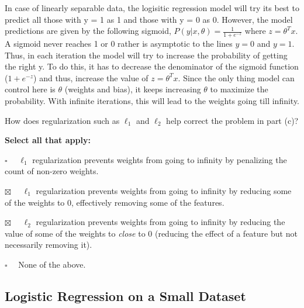 \documentclass[11pt,addpoints,answers]{exam}
\newcommand{\emptysquare}{{\LARGE $\square$}\ \ }
\newcommand{\filledsquare}{{\LARGE $\boxtimes$}\ \ }
\begin{document}
\begin{questions}
    
    \begin{your_solution}[height=6cm]
    In case of linearly separable data, the logisitic regression model will try its best to predict all those with y = 1 as 1 and those with y = 0 as 0. However, the model predictions are given by the following sigmoid, $P(y|x,\theta) = \frac{1}{1 + e^{-z}}$ where $z = \theta^Tx$. A sigmoid never reaches 1 or 0 rather is asymptotic to the lines $y = 0$ and $y = 1$. Thus, in each iteration the model will try to increase the probability of getting the right y. To do this, it has to decrease the denominator of the sigmoid function ($1 + e^{-z}$) and thus, increase the value of  $z = \theta^Tx$. Since the only thing model can control here is $\theta$ (weights and bias), it keeps increasing $\theta$ to maximize the probability. With infinite iterations, this will lead to the weights going till infinity.
    \end{your_solution}
    
    \question[2] How does regularization such as $\ell_1$ and $\ell_2$ help correct the problem in part (c)?
    
    \textbf{Select all that apply:}
    \begin{list}{}
        \item 
            \emptysquare
            $\ell_1$ regularization prevents weights from going to infinity by penalizing the count of non-zero weights.
        \item 
            \filledsquare
            $\ell_1$ regularization prevents weights from going to infinity by reducing some of the weights to 0, effectively removing some of the features. 
        \item 
            \filledsquare
            $\ell_2$ regularization prevents weights from going to infinity by reducing the value of some of the weights to \textit{close} to 0 (reducing the effect of a feature but not necessarily removing it). 
        \item 
            \emptysquare
            None of the above.
    \end{list}

    
\clearpage

\end{questions}

\subsection{Logistic Regression on a Small Dataset}
\label{sec:warm-up}
\end{document}
